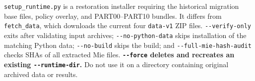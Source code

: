 \texttt{setup\_\allowbreak{}runtime.\allowbreak{}py} is a restoration installer requiring the historical migration base files, policy overlay, and PART00--PART10 bundles. It differs from \texttt{fetch\_\allowbreak{}data}, which downloads the current four \texttt{data-\allowbreak{}v1} ZIP files. \texttt{-\allowbreak{}-\allowbreak{}verify-\allowbreak{}only} exits after validating input archives; \texttt{-\allowbreak{}-\allowbreak{}no-\allowbreak{}python-\allowbreak{}data} skips installation of the matching Python data; \texttt{-\allowbreak{}-\allowbreak{}no-\allowbreak{}build} skips the build; and \texttt{-\allowbreak{}-\allowbreak{}full-\allowbreak{}mie-\allowbreak{}hash-\allowbreak{}audit} checks SHAs of all extracted Mie files. \textbf{\texttt{-\allowbreak{}-\allowbreak{}force} deletes and recreates an existing \texttt{-\allowbreak{}-\allowbreak{}runtime-\allowbreak{}dir}.} Do not use it on a directory containing original archived data or results.


